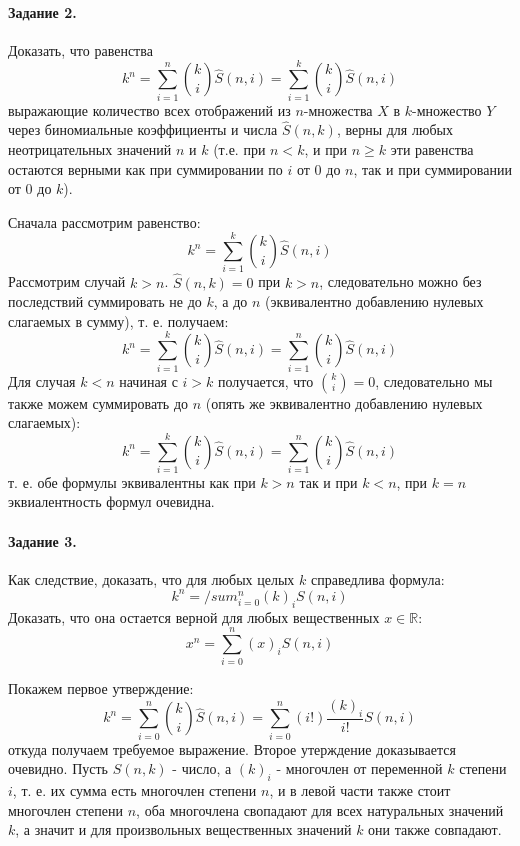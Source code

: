 \documentclass[a4paper,12pt]{article}
\begin{document}
\paragraph{Задание 2.} Доказать, что равенства
\[
	k^n=\sum_{i=1}^n \binom{k}{i} \hat S \left(n,i\right) = \sum_{i=1}^k \binom{k}{i} \hat S \left(n,i\right)
\]
выражающие количество всех отображений из $n$-множества $X$ в $k$-множество $Y$ через биномиальные коэффициенты и числа $\hat S \left(n,k\right)$, верны для любых неотрицательных значений $n$ и $k$ (т.е. при $n<k$, и при $n\ge k$ эти равенства остаются верными как при суммировании по $i$ от 0 до $n$, так и при суммировании от 0 до $k$).

\begin{Proof}
Сначала рассмотрим равенство:
\[
	k^n = \sum_{i=1}^k \binom{k}{i} \hat S \left(n,i\right)
\]
Рассмотрим случай $k>n$. $\hat S \left(n,k\right) = 0$ при $k>n$, следовательно можно без последствий суммировать не до $k$, а до $n$ (эквивалентно добавлению нулевых слагаемых в сумму), т. е. получаем:
\[
	k^n = \sum_{i=1}^k \binom{k}{i} \hat S \left(n,i\right) = \sum_{i=1}^n \binom{k}{i} \hat S \left(n,i\right)
\]
Для случая $k < n$ начиная с $i > k$ получается, что $\binom{k}{i} = 0$, следовательно мы также можем суммировать до $n$ (опять же эквивалентно добавлению нулевых слагаемых):
\[
	k^n = \sum_{i=1}^k \binom{k}{i} \hat S \left(n,i\right) = \sum_{i=1}^n \binom{k}{i} \hat S \left(n,i\right)
\]
т. е. обе формулы эквивалентны как при $k>n$ так и при $k<n$, при $k=n$ эквиалентность формул очевидна.
\end{Proof}

\paragraph{Задание 3.} Как следствие, доказать, что для любых целых $k$ справедлива формула:
\[
	k^n = /sum_{i=0}^n \left(k\right)_i S \left(n,i\right)
\]
Доказать, что она остается верной для любых вещественных $x \in \mathbb{R}$:
\[
	x^n = \sum_{i=0}^n \left(x\right)_i S \left(n,i\right)
\]
\begin{Proof}
Покажем первое утверждение:
\[
	k^n = \sum_{i=0}^n \binom{k}{i} \hat S \left(n,i\right) = \sum_{i=0}^n \left(i!\right) \frac{\left(k\right)_i}{i!} S \left(n,i\right)
\]
откуда получаем требуемое выражение. Второе утерждение доказывается очевидно. Пусть $S \left(n,k\right)$ - число, а $\left(k\right)_i$ - многочлен от переменной $k$ степени $i$, т. е. их сумма есть многочлен степени $n$, и в левой части также стоит многочлен степени $n$, оба многочлена свопадают для всех натуральных значений $k$, а значит и для произвольных вещественных значений $k$ они также совпадают.
\end{Proof}
\end{document}
